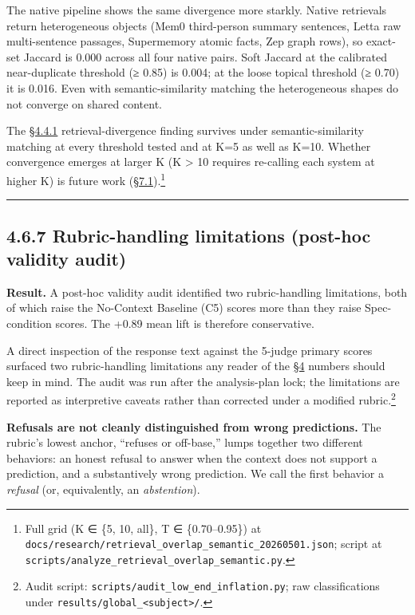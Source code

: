 The native pipeline shows the same divergence more starkly. Native
retrievals return heterogeneous objects (Mem0 third-person summary
sentences, Letta raw multi-sentence passages, Supermemory atomic facts,
Zep graph rows), so exact-set Jaccard is 0.000 across all four native
pairs. Soft Jaccard at the calibrated near-duplicate threshold (≥ 0.85)
is 0.004; at the loose topical threshold (≥ 0.70) it is 0.016. Even with
semantic-similarity matching the heterogeneous shapes do not converge on
shared content.

The \hyperref[cross-system-retrieval-providers-do-not-converge]{§4.4.1} retrieval-divergence finding survives under
semantic-similarity matching at every threshold tested and at K=5 as
well as K=10. Whether convergence emerges at larger K (K \textgreater{}
10 requires re-calling each system at higher K) is future work
(\hyperref[subject-and-corpus-expansion]{§7.1}).\footnote{Full grid
  (K ∈ \{5, 10, all\}, T ∈ \{0.70--0.95\}) at
  \texttt{docs/research/retrieval\_overlap\_semantic\_20260501.json};
  script at
  \texttt{scripts/analyze\_retrieval\_overlap\_semantic.py}.}

\begin{center}\rule{0.5\linewidth}{0.5pt}\end{center}

\hypertarget{rubric-handling-limitations-post-hoc-validity-audit-1}{%
\subsection{4.6.7 Rubric-handling limitations (post-hoc validity
audit)}\label{rubric-handling-limitations-post-hoc-validity-audit-1}}

\textbf{Result.} A post-hoc validity audit identified two
rubric-handling limitations, both of which raise the No-Context Baseline
(C5) scores more than they raise Spec-condition scores. The +0.89 mean
lift is therefore conservative.

A direct inspection of the response text against the 5-judge primary
scores surfaced two rubric-handling limitations any reader of the \hyperref[results]{§4}
numbers should keep in mind. The audit was run after the analysis-plan
lock; the limitations are reported as interpretive caveats rather than
corrected under a modified rubric.\footnote{Audit script:
  \texttt{scripts/audit\_low\_end\_inflation.py}; raw classifications
  under \texttt{results/global\_\textless{}subject\textgreater{}/}.}

\textbf{Refusals are not cleanly distinguished from wrong predictions.}
The rubric's lowest anchor, ``refuses or off-base,'' lumps together two
different behaviors: an honest refusal to answer when the context does
not support a prediction, and a substantively wrong prediction. We call
the first behavior a \emph{refusal} (or, equivalently, an
\emph{abstention}).

